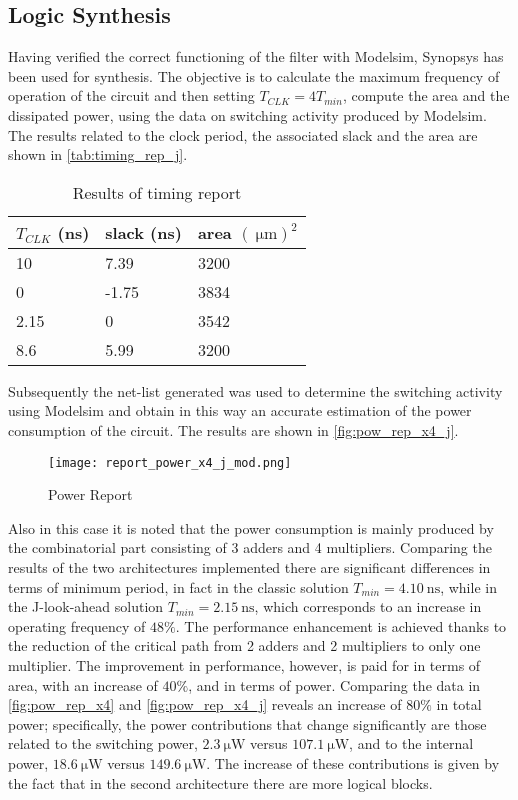 \subsection{Logic Synthesis}
Having verified the correct functioning of the filter with Modelsim, Synopsys has been used for synthesis. The objective is to calculate the maximum frequency of operation of the circuit and then setting $T_{CLK} = 4 T_{min}$, compute the area and the dissipated power, using the data on switching activity produced by Modelsim.
The results related to the clock period, the associated slack and the area are shown in \autoref{tab:timing_rep_j}.

\begin{table}[h]
\begin{center}
\begin{tabular}{|l|l|l|}
\hline
$T_{CLK}$ (ns) & slack (ns) & area $(\SI{}{\micro\meter})^2$ \\
\hline
10 & 7.39 &  3200\\
0 & -1.75 &  3834\\
2.15 & 0 & 3542 \\
8.6 & 5.99 & 3200 \\
\hline
\end{tabular}
\end{center}
\caption{Results of timing report}
\label{tab:timing_rep_j}
\end{table}

Subsequently the net-list generated was used to determine the switching activity using Modelsim and obtain in this way an accurate estimation of the power consumption of the circuit. The results are shown in \autoref{fig:pow_rep_x4_j}.

\begin{figure}[h]
	\center
	\texttt{[image: report\_power\_x4\_j\_mod.png]}
	\caption{Power Report}
	\label{fig:pow_rep_x4_j}
\end{figure}

Also in this case it is noted that the power consumption is mainly produced by the combinatorial part consisting of 3 adders and 4 multipliers.
Comparing the results of the two architectures implemented there are significant differences in terms of minimum period, in fact in the classic solution $T_{min}=\SI{4.10}{\nano\second}$, while in the J-look-ahead solution $T_{min}=\SI{2.15}{\nano\second}$, which corresponds to an increase in operating frequency of $48\%$. The performance enhancement is achieved thanks to the reduction of the critical path from 2 adders and 2 multipliers to only one multiplier. The improvement in performance, however, is paid for in terms of area, with an increase of $40\%$, and in terms of power. Comparing the data in \autoref{fig:pow_rep_x4} and \autoref{fig:pow_rep_x4_j} reveals an increase of $80\%$ in total power; specifically, the power contributions that change significantly are those related to the switching power, $\SI{2.3}{\micro\watt}$ versus $\SI{107.1}{\micro\watt}$, and to the internal power, $\SI{18.6}{\micro\watt}$ versus $\SI{149.6}{\micro\watt}$. The increase of these contributions is given by the fact that in the second architecture there are more logical blocks.

